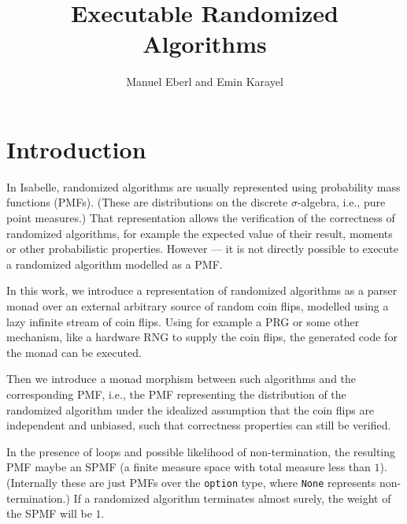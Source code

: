 \documentclass[11pt,a4paper]{article}
\begin{document}
\title{Executable Randomized Algorithms}
\author{Manuel Eberl and Emin Karayel}
\maketitle


\tableofcontents

\section{Introduction}
In Isabelle, randomized algorithms are usually represented using probability mass functions (PMFs). 
(These are distributions on the discrete $\sigma$-algebra, i.e., pure point measures.) That 
representation allows the verification of the correctness of randomized algorithms, for example
the expected value of their result, moments or other probabilistic properties. However --- it is not 
directly possible to execute a randomized algorithm modelled as a PMF.

In this work, we introduce a representation of randomized algorithms as a parser monad over an 
external arbitrary source of random coin flips, modelled using a lazy infinite stream of coin flips.
Using for example a PRG or some other mechanism, like a hardware RNG to supply the coin flips, the
generated code for the monad can be executed.

Then we introduce a monad morphism between such algorithms and the corresponding PMF, i.e., the PMF
representing the distribution of the randomized algorithm under the idealized assumption that the 
coin flips are independent and unbiased, such that correctness properties can still be verified.

In the presence of loops and possible likelihood of non-termination, the resulting PMF maybe an
SPMF (a finite measure space with total measure less than $1$). (Internally these are just PMFs over
the \verb+option+ type, where \verb+None+ represents non-termination.) If a randomized algorithm 
terminates almost surely, the weight of the SPMF will be $1$.
\end{document}
